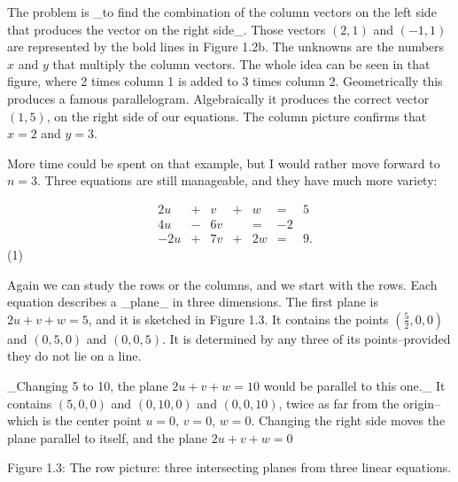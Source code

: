 The problem is _to find the combination of the column vectors on the left side that produces the vector on the right side_. Those vectors \((2,1)\) and \((-1,1)\) are represented by the bold lines in Figure 1.2b. The unknowns are the numbers \(x\) and \(y\) that multiply the column vectors. The whole idea can be seen in that figure, where 2 times column 1 is added to 3 times column 2. Geometrically this produces a famous parallelogram. Algebraically it produces the correct vector \((1,5)\), on the right side of our equations. The column picture confirms that \(x=2\) and \(y=3\).

More time could be spent on that example, but I would rather move forward to \(n=3\). Three equations are still manageable, and they have much more variety:

\[\begin{array}{ccccccc}&2u&+&v&+&w&=&5\\ &4u&-&6v&&=&-2\\ &-2u&+&7v&+&2w&=&9.\end{array}\] (1)

Again we can study the rows or the columns, and we start with the rows. Each equation describes a _plane_ in three dimensions. The first plane is \(2u+v+w=5\), and it is sketched in Figure 1.3. It contains the points \((\frac{5}{2},0,0)\) and \((0,5,0)\) and \((0,0,5)\). It is determined by any three of its points--provided they do not lie on a line.

_Changing 5 to 10, the plane \(2u+v+w=10\) would be parallel to this one._ It contains \((5,0,0)\) and \((0,10,0)\) and \((0,0,10)\), twice as far from the origin--which is the center point \(u=0\), \(v=0\), \(w=0\). Changing the right side moves the plane parallel to itself, and the plane \(2u+v+w=0\)

Figure 1.3: The row picture: three intersecting planes from three linear equations.

 